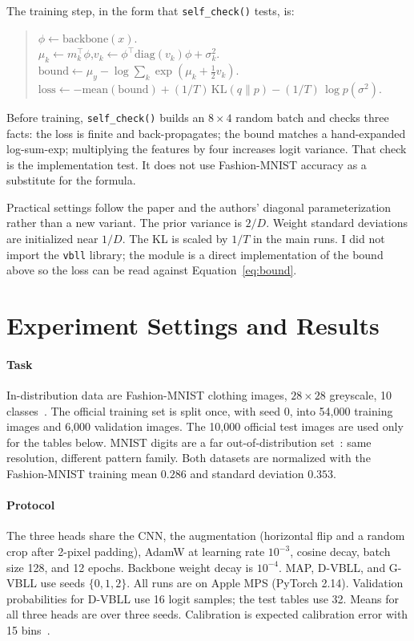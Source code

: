 \documentclass[11pt,a4paper]{article}
\begin{document}
The training step, in the form that \texttt{self\_check()} tests, is:
\begin{quote}
\small
$\phi \leftarrow \mathrm{backbone}(x)$.\\
$\mu_k \leftarrow m_k^{\top}\phi$,\quad $v_k \leftarrow \phi^{\top}\mathrm{diag}(v_k)\phi+\sigma_k^{2}$.\\
$\mathrm{bound} \leftarrow \mu_y - \log\sum_k\exp(\mu_k+\tfrac12 v_k)$.\\
$\mathrm{loss} \leftarrow -\mathrm{mean}(\mathrm{bound})+(1/T)\,\mathrm{KL}(q\|p)-(1/T)\,\log p(\sigma^{2})$.
\end{quote}
Before training, \texttt{self\_check()} builds an $8\times 4$ random batch and checks three facts: the loss is finite and back-propagates; the bound matches a hand-expanded log-sum-exp; multiplying the features by four increases logit variance.
That check is the implementation test.
It does not use Fashion-MNIST accuracy as a substitute for the formula.

Practical settings follow the paper and the authors' diagonal parameterization rather than a new variant.
The prior variance is $2/D$.
Weight standard deviations are initialized near $1/D$.
The KL is scaled by $1/T$ in the main runs.
I did not import the \texttt{vbll} library; the module is a direct implementation of the bound above so the loss can be read against Equation~\eqref{eq:bound}.

\section{Experiment Settings and Results}
\paragraph{Task}
In-distribution data are Fashion-MNIST clothing images, $28\times 28$ greyscale, 10 classes~\cite{xiao2017fashion}.
The official training set is split once, with seed 0, into 54{,}000 training images and 6{,}000 validation images.
The 10{,}000 official test images are used only for the tables below.
MNIST digits are a far out-of-distribution set~\cite{lecun1998gradient}: same resolution, different pattern family.
Both datasets are normalized with the Fashion-MNIST training mean $0.286$ and standard deviation $0.353$.

\paragraph{Protocol}
The three heads share the CNN, the augmentation (horizontal flip and a random crop after 2-pixel padding), AdamW at learning rate $10^{-3}$, cosine decay, batch size 128, and 12 epochs.
Backbone weight decay is $10^{-4}$.
MAP, D-VBLL, and G-VBLL use seeds $\{0,1,2\}$. All runs are on Apple MPS (PyTorch 2.14).
Validation probabilities for D-VBLL use 16 logit samples; the test tables use 32.
Means for all three heads are over three seeds.
Calibration is expected calibration error with 15 bins~\cite{guo2017calibration}.
\end{document}
